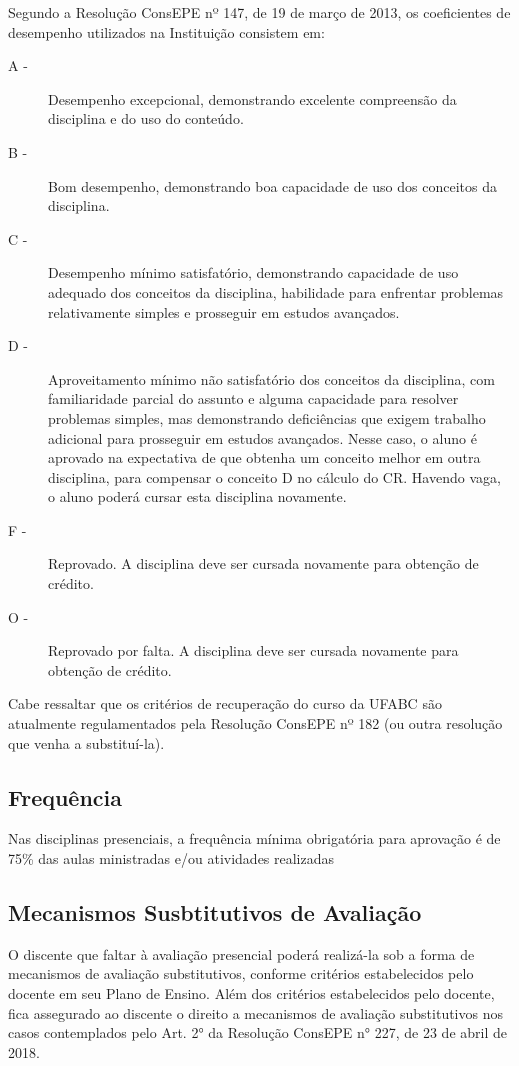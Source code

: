 Segundo a Resolução ConsEPE nº 147, de 19 de março de 2013, os coeficientes de
desempenho utilizados na Instituição consistem em:
\begin{description}
    \item[A -] Desempenho excepcional, demonstrando excelente compreensão da
    disciplina e do uso do conteúdo.
    \item[B -] Bom desempenho, demonstrando boa capacidade de uso dos conceitos
    da disciplina.
    \item[C -] Desempenho mínimo satisfatório, demonstrando capacidade de uso
    adequado dos conceitos da disciplina, habilidade para enfrentar problemas
    relativamente simples e prosseguir em estudos avançados.
    \item[D -] Aproveitamento mínimo não satisfatório dos conceitos da
    disciplina, com familiaridade parcial do assunto e alguma capacidade para
    resolver problemas simples, mas demonstrando deficiências que exigem
    trabalho adicional para prosseguir em estudos avançados. Nesse caso, o
    aluno é aprovado na expectativa de que obtenha um conceito melhor em outra
    disciplina, para compensar o conceito D no cálculo do CR. Havendo vaga, o
    aluno poderá cursar esta disciplina novamente.
    \item[F -] Reprovado. A disciplina deve ser cursada novamente para obtenção
    de crédito.
    \item[O -] Reprovado por falta. A disciplina deve ser cursada novamente
    para obtenção de crédito.
\end{description}


Cabe ressaltar que os critérios de recuperação do curso da UFABC são atualmente
regulamentados pela Resolução ConsEPE nº 182 (ou outra resolução que venha a
substituí-la).

\subsection{Frequência}
Nas disciplinas presenciais, a frequência mínima obrigatória para aprovação é de
75\% das aulas ministradas e/ou atividades realizadas

\subsection{Mecanismos Susbtitutivos de Avaliação}
O discente que faltar à avaliação presencial poderá realizá-la sob a forma de
mecanismos de avaliação substitutivos, conforme critérios estabelecidos pelo docente
em seu Plano de Ensino. Além dos critérios estabelecidos pelo docente, fica
assegurado ao discente o direito a mecanismos de avaliação substitutivos nos casos
contemplados pelo Art. 2° da Resolução ConsEPE n° 227, de 23 de abril de 2018.

